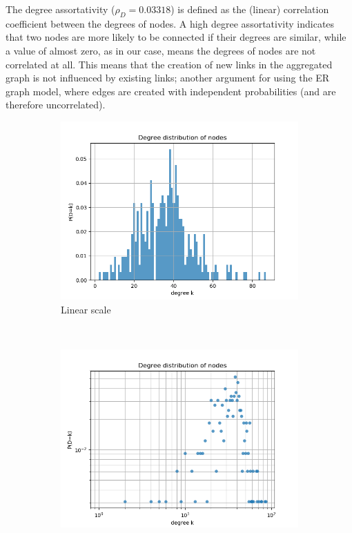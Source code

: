 \documentclass[letterpaper]{article}
\begin{document}
The degree assortativity (\(\rho_D=0.03318\)) is defined as the (linear) correlation coefficient between the degrees of nodes. A high degree assortativity indicates that two nodes are more likely to be connected if their degrees are similar, while a value of almost zero, as in our case, means the degrees of nodes are not correlated at all.  
This means that the creation of new links in the aggregated graph is not influenced by existing links; another argument for using the ER graph model, where edges are created with independent probabilities (and are therefore uncorrelated).

\begin{figure}
    \centering
    \begin{subfigure}[b]{0.49\textwidth}
        \includegraphics[width=\textwidth]{img/degree_distribution.png}
        \caption{Linear scale}
	    \label{fig:degree_distribution_linlin}
    \end{subfigure}
    ~ %
    \begin{subfigure}[b]{0.48\textwidth}
        \includegraphics[width=\textwidth]{img/degree_distribution_loglog.png}

\end{subfigure}
\end{figure}
\end{document}
